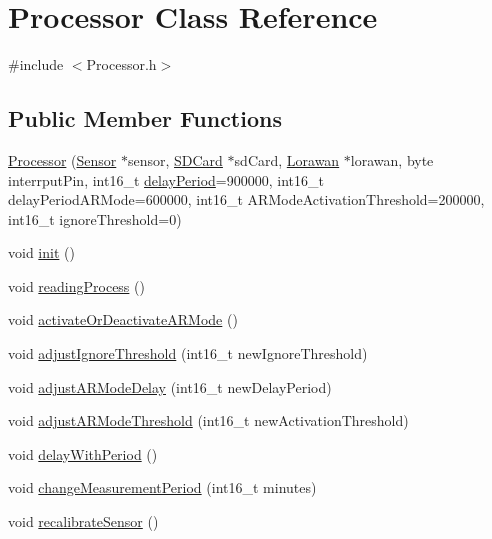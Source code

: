 \hypertarget{class_processor}{}\section{Processor Class Reference}
\label{class_processor}


{\ttfamily \#include $<$Processor.\+h$>$}

\subsection*{Public Member Functions}
\begin{DoxyCompactItemize}
\item 
\mbox{\hyperlink{class_processor_a4e9231316672f0a9daf138a08065ea8f}{Processor}} (\mbox{\hyperlink{class_sensor}{Sensor}} $\ast$sensor, \mbox{\hyperlink{class_s_d_card}{S\+D\+Card}} $\ast$sd\+Card, \mbox{\hyperlink{class_lorawan}{Lorawan}} $\ast$lorawan, byte interrput\+Pin, int16\+\_\+t \mbox{\hyperlink{class_processor_acfaad87bb46ff80f1b7966624542e6ef}{delay\+Period}}=900000, int16\+\_\+t delay\+Period\+A\+R\+Mode=600000, int16\+\_\+t A\+R\+Mode\+Activation\+Threshold=200000, int16\+\_\+t ignore\+Threshold=0)
\item 
void \mbox{\hyperlink{class_processor_a22e869ee49d974ad0ee7ee81961ab88f}{init}} ()
\item 
void \mbox{\hyperlink{class_processor_a694b889c3c6f8c09b998b4012d304d6e}{reading\+Process}} ()
\item 
void \mbox{\hyperlink{class_processor_a9316beb5903476939018dce45e992c53}{activate\+Or\+Deactivate\+A\+R\+Mode}} ()
\item 
void \mbox{\hyperlink{class_processor_a4b4e65040fd7bc17e978412c1af8e0c8}{adjust\+Ignore\+Threshold}} (int16\+\_\+t new\+Ignore\+Threshold)
\item 
void \mbox{\hyperlink{class_processor_a527c24bbc2784d267d9ff2b21fd21379}{adjust\+A\+R\+Mode\+Delay}} (int16\+\_\+t new\+Delay\+Period)
\item 
void \mbox{\hyperlink{class_processor_a58a2f6a482491cb003f4ff1bd45ba891}{adjust\+A\+R\+Mode\+Threshold}} (int16\+\_\+t new\+Activation\+Threshold)
\item 
void \mbox{\hyperlink{class_processor_a6ad79126a7694ed86f3f5ccc36b606bd}{delay\+With\+Period}} ()
\item 
void \mbox{\hyperlink{class_processor_a8b550c7a6be09f887291e14392cead11}{change\+Measurement\+Period}} (int16\+\_\+t minutes)
\item 
void \mbox{\hyperlink{class_processor_ae18acf2c55d0a3bcd7412f86d388808d}{recalibrate\+Sensor}} ()

\end{DoxyCompactItemize}
